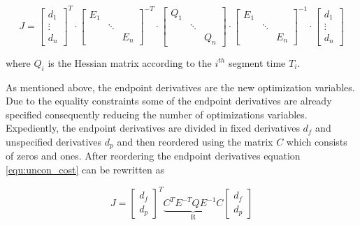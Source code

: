 \begin{equation}
J =
\begin{bmatrix}
   d_1 \\
\vdots \\
  d_n
\end{bmatrix}^T
\cdot
\begin{bmatrix}
   E_1 &  &  \\
    & \ddots &  \\
   & & E_n
\end{bmatrix} ^{-T}
\cdot
\begin{bmatrix}
   Q_1 &  &  \\
    & \ddots &  \\
   & & Q_n
\end{bmatrix} 
\cdot
\begin{bmatrix}
   E_1 &  &  \\
    & \ddots &  \\
   & & E_n
\end{bmatrix} ^{-1}
\cdot
\begin{bmatrix}
   d_1 \\
\vdots \\
  d_n
\end{bmatrix}
\label{equ:uncon_cost}
\end{equation}

where $Q_i$ is the Hessian matrix according to the $i^{th}$ segment time $T_i$.\newline

As mentioned above, the endpoint derivatives are the new optimization variables. Due to the equality constraints some of the endpoint derivatives are already specified consequently reducing the number of optimizations variables. Expediently, the endpoint derivatives are divided in fixed derivatives $d_f$ and unspecified derivatives $d_p$ and then reordered using the matrix $C$ which consists of zeros and ones. After reordering the endpoint derivatives equation \ref{equ:uncon_cost} can be rewritten as

\begin{equation}
J =
\begin{bmatrix}
   d_f \\
  d_p
\end{bmatrix}^T
\underbrace{C^T E^{-T} Q E^{-1} C}_\text{R}
\begin{bmatrix}
   d_f \\
  d_p
\end{bmatrix}
\label{equ:R_cost}
\end{equation}

